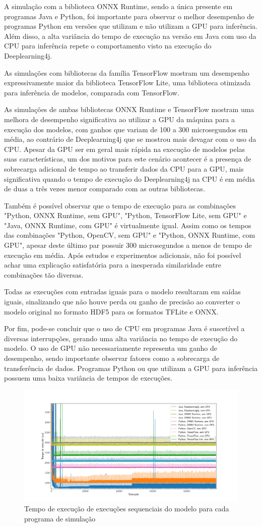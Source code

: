 A simulação com a biblioteca ONNX Runtime, sendo a única presente em programas Java e Python, foi importante para observar o melhor desempenho de programas Python em versões que utilizam e não utilizam a GPU para inferência. Além disso, a alta variância do tempo de execução na versão em Java com uso da CPU para inferência repete o comportamento visto na execução do Deeplearning4j.

As simulações com bibliotecas da família TensorFlow mostram um desempenho expressivamente maior da biblioteca TensorFlow Lite, uma biblioteca otimizada para inferência de modelos, comparada com TensorFlow.

As simulações de ambas bibliotecas ONNX Runtime e TensorFlow mostram uma melhora de desempenho significativa ao utilizar a GPU da máquina para a execução dos modelos, com ganhos que variam de 100 a 300 microsegundos em média, ao contrário de Deeplearning4j que se mostrou mais devagar com o uso da CPU. Apesar da GPU ser em geral mais rápida na execução de modelos pelas suas características, um dos motivos para este cenário acontecer é a presença de sobrecarga adicional de tempo ao transferir dados da CPU para a GPU, mais significativa quando o tempo de execução do Deeplearning4j na CPU é em média de duas a três vezes menor comparado com as outras bibliotecas.

Também é possível observar que o tempo de execução para as combinações "Python, ONNX Runtime, sem GPU", "Python, TensorFlow Lite, sem GPU" e "Java, ONNX Runtime, com GPU" é virtualmente igual. Assim como os tempos das combinações "Python, OpenCV, sem GPU" e "Python, ONNX Runtime, com GPU", apesar deste último par possuir 300 microsegundos a menos de tempo de execução em média. Após estudos e experimentos adicionais, não foi possível achar uma explicação satisfatória para a inesperada similaridade entre combinações tão diversas.

Todas as execuções com entradas iguais para o modelo resultaram em saídas iguais, sinalizando que não houve perda ou ganho de precisão ao converter o modelo original no formato HDF5 para os formatos TFLite e ONNX.

Por fim, pode-se concluir que o uso de CPU em programas Java é suscetível a diversas interrupções, gerando uma alta variância no tempo de execução do modelo. O uso de GPU não necessariamente representa um ganho de desempenho, sendo importante observar fatores como a sobrecarga de transferência de dados. Programas Python ou que utilizam a GPU para inferência possuem uma baixa variância de tempos de execuções.

\begin{figure}[h]
  \centerline{\includegraphics[width=\paperwidth]{img/all.pdf}}
  \caption{Tempo de execução de execuções sequenciais do modelo para cada programa de simulação}
  \label{fig:all}
\end{figure}